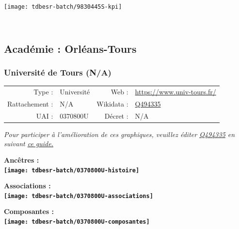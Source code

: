 \documentclass[12pt,french,]{article}
\begin{document}
\begin{center}\texttt{[image: tdbesr-batch/9830445S-kpi]} \end{center}\checkoddpage

\ifoddpage ~\newpage \fi   

\hypertarget{acaduxe9mie-orluxe9ans-tours}{%
\subsection{Académie :
Orléans-Tours}\label{acaduxe9mie-orluxe9ans-tours}}

\hypertarget{universituxe9-de-tours-na}{%
\subsubsection{Université de Tours
(N/A)}\label{universituxe9-de-tours-na}}

\begin{tabular*}{\textwidth}{rp{5cm}rl}  
\hline  
Type : & Université & Web : &\href{https://www.univ-tours.fr/}{https://www.univ-tours.fr/} \\  
Rattachement : & N/A & Wikidata : & \href{https://www.wikidata.org/entity/Q494335}{Q494335} \\  
UAI : & 0370800U & Décret : & N/A \\  
\hline  
\end{tabular*}

\textit{\scriptsize Pour participer à l'amélioration de ces graphiques, veuillez éditer  \href{https://www.wikidata.org/entity/Q494335}{Q494335}  en suivant \href{https://github.com/cpesr/wikidataESR/blob/master/Rmd/wikidataESR.md}{ce guide.}}

\vspace{1cm}  
\begin{minipage}[b]{0.50\textwidth}\begin{center} \bf Ancêtres : \\  
\texttt{[image: tdbesr-batch/0370800U-histoire]} \end{center}\end{minipage}\begin{minipage}[b]{0.50\textwidth}\begin{center} \bf Associations : \\  
\texttt{[image: tdbesr-batch/0370800U-associations]} \end{center}\end{minipage}

\hrulefill

\begin{center} \bf Composantes : \\  
\texttt{[image: tdbesr-batch/0370800U-composantes]} \end{center}
\end{document}
